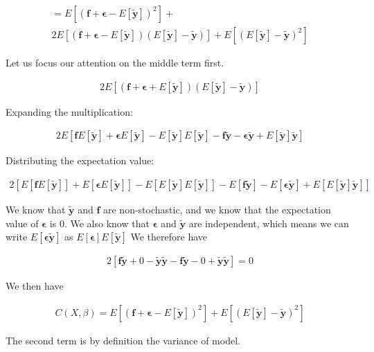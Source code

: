 \documentclass[twocolumn,10pt,cleanfoot]{asme2ej}
\begin{document}
\begin{multline}
= E[(\bm{f} + \bm{\epsilon} - E[\bm{\tilde{y}}])^2] + \\
	2E[(\bm{f} + \bm{\epsilon} - E[\bm{\tilde{y}}])(E[\bm{\tilde{y}}] - \bm{\tilde{y}})] + E[(E[\bm{\tilde{y}}] - \bm{\tilde{y}})^2]
\end{multline}

Let us focus our attention on the middle term first.

\begin{gather}
2E\left[(\bm{f} + \bm{\epsilon} + E[\bm{\tilde{y}}])(E[\bm{\tilde{y}}] - \bm{\tilde{y}})\right] 
\end{gather}

Expanding the multiplication:

\begin{gather}
2E\left[\bm{f}E[\bm{\tilde{y}}] + \bm{\epsilon}E[\bm{\tilde{y}}] - E[\bm{\tilde{y}}]E[\bm{\tilde{y}}] - \bm{f}\bm{\tilde{y}} - \bm{\epsilon}\bm{\tilde{y}} + E[\bm{\tilde{y}}]\bm{\tilde{y}}\right] 
\end{gather}

Distributing the expectation value:

\begin{gather}
2\left[E[\bm{f}E[\bm{\tilde{y}}]] + E[\bm{\epsilon}E[\bm{\tilde{y}}]] - E[E[\bm{\tilde{y}}]E[\bm{\tilde{y}}]] - E[\bm{f}\bm{\tilde{y}}] - E[\bm{\epsilon}\bm{\tilde{y}}] + E[E[\bm{\tilde{y}}]\bm{\tilde{y}}]\right] 
\end{gather}

We know that $\bm{\tilde{y}}$ and $\bm{f}$ are non-stochastic, and we know that the expectation value of $\bm{\epsilon}$ is $0$. We also know that 
$\bm{\epsilon}$ and $\bm{\tilde{y}}$ are independent, which means we can write $E[\bm{\epsilon}\bm{\tilde{y}}]$ as $E[\bm{\epsilon}]E[\bm{\tilde{y}}]$ We therefore have

\begin{gather}
2\left[\bm{f}\bm{\tilde{y}} + 0 - \bm{\tilde{y}}\bm{\tilde{y}} - \bm{f}\bm{\tilde{y}} - 0 + \bm{\tilde{y}}\bm{\tilde{y}}\right] = 0 
\end{gather}

We then have

\begin{gather}
C(X,\beta) = E\left[(\bm{f} + \bm{\epsilon} - E[\bm{\tilde{y}}])^2\right] + E\left[(E[\bm{\tilde{y}}] - \bm{\tilde{y}})^2\right] 
\end{gather}

The second term is by definition the variance of model.
\end{document}
